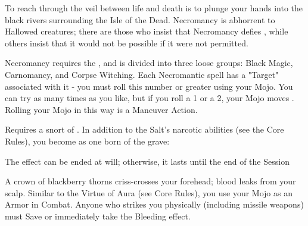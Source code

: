 

To reach through the veil between life and death is to plunge your hands into the black rivers surrounding the Isle of the Dead.  Necromancy is abhorrent to Hallowed creatures; there are those who insist that Necromancy defies \TheAuthority, while others insist that it would not be possible if it were not permitted.  


Necromancy requires the , and is divided into three loose groups:  Black Magic, Carnomancy, and Corpse Witching.  Each Necromantic spell has a "Target" associated with it - you must roll this number or greater using your Mojo.  You can try as many times as you like, but if you roll a 1 or a 2, your Mojo moves \DCDOWN.  Rolling your Mojo in this way is a Maneuver Action.



\NECRO[
  Name=Born of the Grave,
  Link=necromancy-born-of-the-grave,
  Paradigm=Death,
  Save=N,
  Duration=Session,
  Target=4
]

Requires a snort of .  In addition to the Salt's narcotic abilities (see the Core Rules), you become as one born of the grave:


The effect can be ended at will; otherwise, it lasts until the end of the Session

\NECRO[
  Name=Crown of Thorns,
  Link=necromancy-crown-of-thorns,
  Paradigm=Death,
  Save=N,
  Duration=Session (see below),
  Target=5
]

A crown of blackberry thorns criss-crosses your forehead; blood leaks from your scalp.  Similar to the Virtue of Aura (see Core Rules), you use your Mojo as an Armor \UD in Combat.  Anyone who strikes you physically (including missile weapons) must Save or immediately take the Bleeding effect.  

